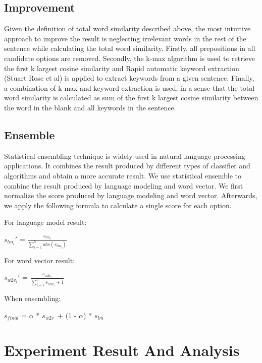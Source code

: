 \documentclass[11pt]{article}
\begin{document}
\subsection{Improvement}
Given the definition of total word similarity described above, the most intuitive approach to improve the result is neglecting irrelevant words in the rest of the sentence while calculating the total word similarity. Firstly, all prepositions in all candidate options are removed. Secondly, the k-max algorithm is used to retrieve the first k largest cosine similarity and Rapid automatic keyword extraction (Stuart Rose et al) is applied to extract keywords from a given sentence. Finally, a combination of k-max and keyword extraction is used, in a sense that the total word similarity is calculated as sum of the first k largest cosine similarity between the word in the blank and all keywords in the sentence. 
\subsection{Ensemble}
Statistical ensembling technique is widely used in natural language processing applications. It combines the result produced by different types of classifier and algorithms and obtain a more accurate result. We use statistical ensemble to combine the result produced by language modeling and word vector. We first normalize the score produced by language modeling and word vector. Afterwards, we apply the following formula to calculate a single score for each option. 

 For language model result:
\begin{center}
$s_{lm_i}'$ = $\frac{s_{lm_i}}{\sum_{i=1}^{5}{abs(s_{lm_i})}}$
\end{center}
For word vector result:
\begin{center}
$s_{w2v_i}'$ = $\frac{s_{w2v_i}}{\sum_{i=1}^{5}{s_{w2v_i}+1}}$ 
\end{center}
When ensembling:
\begin{center}
$s_{final}$ = $\alpha$ * $ s_{w2v}$\ + (1 - $\alpha$) * $s_{lm}$
\end{center}
\section{Experiment Result And Analysis}
\end{document}
